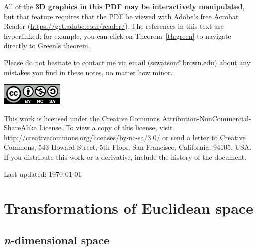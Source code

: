 \documentclass[prettycode,shellescape]{watsonbook}
\begin{document}
\vspace{6pt}

All of the \textbf{3D graphics in this PDF may be interactively
  manipulated}, but that feature requires that the PDF be viewed with
Adobe's free Acrobat Reader
(\href{https://get.adobe.com/reader/}{\url{https://get.adobe.com/reader/}}). The
references in this text are hyperlinked; for example, you can click on
Theorem~\ref{th:green} to navigate directly to Green's theorem.

Please do not hesitate to contact me via email
(\url{sswatson@brown.edu}) about any mistakes you find in these notes,
no matter how minor.

\newpage


\null\vfill 

\includegraphics[width=3cm]{figures/cc-by-nc-sa.pdf} \\
{\small
  This work is licensed under the Creative Commons
  Attribution-NonCommercial-ShareAlike License. To view a copy of this
  license, visit 
  \url{http://creativecommons.org/licenses/by-nc-sa/3.0/} 
  or
  send a letter to Creative Commons, 543 Howard Street, 5th Floor, San
  Francisco, California, 94105, USA. If you distribute this work or a
  derivative, include the history of the document.


  Last updated: \today 
}

\vspace{5cm}

\newpage

\tableofcontents

\newpage


\chapter{Transformations of Euclidean space}

\section{\textit{n}-dimensional space} \label{sec:ndimspace} 
\end{document}

